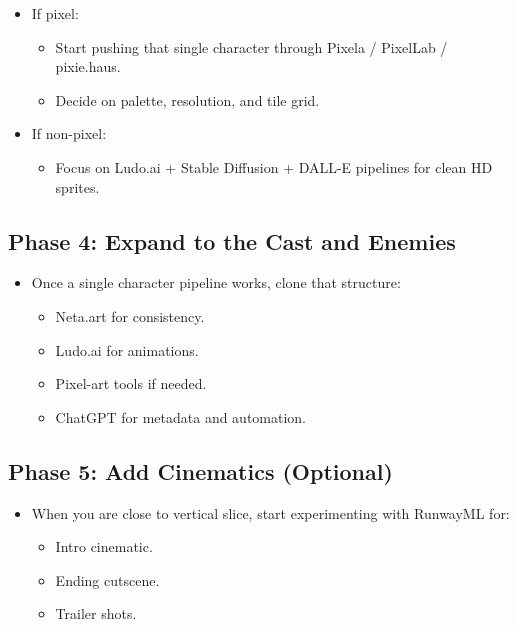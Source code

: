 \documentclass[11pt]{article}
\begin{document}
\begin{itemize}
    \item If pixel:
    \begin{itemize}
        \item Start pushing that single character through Pixela / PixelLab / pixie.haus.
        \item Decide on palette, resolution, and tile grid.
    \end{itemize}
    \item If non-pixel:
    \begin{itemize}
        \item Focus on Ludo.ai + Stable Diffusion + DALL-E pipelines for clean HD sprites.
    \end{itemize}
\end{itemize}

\subsection*{Phase 4: Expand to the Cast and Enemies}

\begin{itemize}
    \item Once a single character pipeline works, clone that structure:
    \begin{itemize}
        \item Neta.art for consistency.
        \item Ludo.ai for animations.
        \item Pixel-art tools if needed.
        \item ChatGPT for metadata and automation.
    \end{itemize}
\end{itemize}

\subsection*{Phase 5: Add Cinematics (Optional)}

\begin{itemize}
    \item When you are close to vertical slice, start experimenting with RunwayML for:
    \begin{itemize}
        \item Intro cinematic.
        \item Ending cutscene.
        \item Trailer shots.
    \end{itemize}
\end{itemize}
\end{document}
